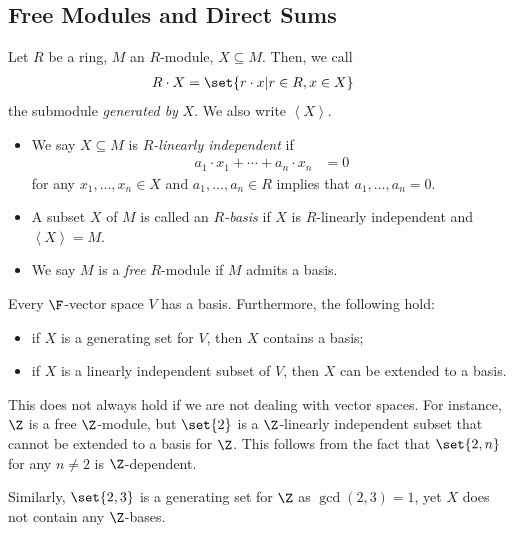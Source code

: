 \documentclass[10pt]{mypackage}
\begin{document}
\subsection{Free Modules and Direct Sums}%
\begin{definition}
  Let $R$ be a ring, $M$ an $R$-module, $X\subseteq M$. Then, we call 
  \begin{align*}
    R\cdot X &= \set{r\cdot x | r\in R, x\in X}
  \end{align*}
  the submodule \textit{generated by} $X$. We also write $ \left\langle X \right\rangle $.
\end{definition}
\begin{definition}\hfill
  \begin{itemize}
    \item We say $X\subseteq M$ is \textit{$R$-linearly independent} if
      \begin{align*}
        a_1\cdot x_1 + \cdots + a_n\cdot x_n &= 0
      \end{align*}
      for any $x_1,\dots,x_n\in X$ and $a_1,\dots,a_n\in R$ implies that $a_1,\dots,a_n = 0$.
    \item A subset $X$ of $M$ is called an \textit{$R$-basis} if $X$ is $R$-linearly independent and $\left\langle X \right\rangle = M$.
    \item We say $M$ is a \textit{free} $R$-module if $M$ admits a basis.
  \end{itemize}
\end{definition}
\begin{theorem}
  Every $\F$-vector space $V$ has a basis. Furthermore, the following hold:
  \begin{itemize}
    \item if $X$ is a generating set for $V$, then $X$ contains a basis;
    \item if $X$ is a linearly independent subset of $V$, then $X$ can be extended to a basis.
  \end{itemize}
\end{theorem}
\begin{example}
  This does not always hold if we are not dealing with vector spaces. For instance, $\Z$ is a free $\Z$-module, but $\set{2}$ is a $\Z$-linearly independent subset that cannot be extended to a basis for $\Z$. This follows from the fact that $\set{2,n}$ for any $n\neq 2$ is $\Z$-dependent.\newline

  Similarly, $\set{2,3}$ is a generating set for $\Z$ as $\operatorname{gcd}\left( 2,3 \right) = 1$, yet $X$ does not contain any $\Z$-bases.
\end{example}
\end{document}
